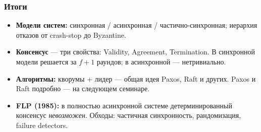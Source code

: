 \documentclass{beamer}
\begin{document}
\begin{frame}
\frametitle{Итоги}

\begin{itemize}
  \item \textbf{Модели систем:} синхронная / асинхронная / частично-синхронная;
    иерархия отказов от crash-stop до Byzantine.
  \item \textbf{Консенсус} --- три свойства: Validity, Agreement, Termination.
    В синхронной модели решается за $f{+}1$ раундов; в асинхронной --- нетривиально.
  \item \textbf{Алгоритмы:} кворумы + лидер --- общая идея Paxos, Raft и других.
    Paxos и Raft подробно --- на следующем семинаре.
  \item \textbf{FLP (1985):} в полностью асинхронной системе детерминированный консенсус
    \emph{невозможен}. Обходы: частичная синхронность, рандомизация, failure detectors.
\end{itemize}

\end{frame}
\end{document}
